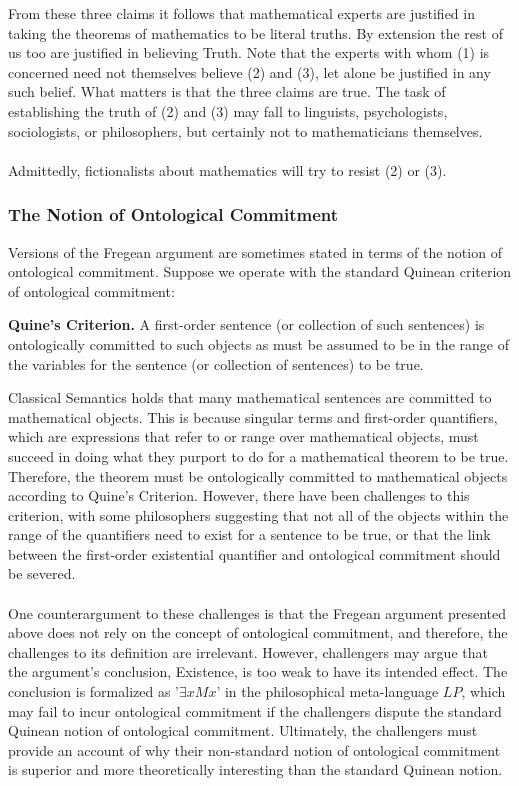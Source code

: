 \documentclass[10pt,a4paper]{article}
\newcounter{theo}
\begin{document}
                        From these three claims it follows that mathematical experts are justified in taking the theorems of mathematics to be literal truths. By extension the rest of us too are justified in believing Truth. Note that the experts with whom (1) is concerned need not themselves believe (2) and (3), let alone be justified in any such belief. What matters is that the three claims are true. The task of establishing the truth of (2) and (3) may fall to linguists, psychologists, sociologists, or philosophers, but certainly not to mathematicians themselves.
                        \\
                        \\
                        Admittedly, fictionalists about mathematics will try to resist (2) or (3).\cite{sep-platonism-mathematics}
                    \subsubsection{The Notion of Ontological Commitment}
                        Versions of the Fregean argument are sometimes stated in terms of the notion of ontological commitment. Suppose we operate with the standard Quinean criterion of ontological commitment:
                        \begin{qt}
                            \textbf{Quine’s Criterion.}
                            A first-order sentence (or collection of such sentences) is ontologically committed to such objects as must be assumed to be in the range of the variables for the sentence (or collection of sentences) to be true.
                        \end{qt}
                        Classical Semantics holds that many mathematical sentences are committed to mathematical objects. This is because singular terms and first-order quantifiers, which are expressions that refer to or range over mathematical objects, must succeed in doing what they purport to do for a mathematical theorem to be true. Therefore, the theorem must be ontologically committed to mathematical objects according to Quine's Criterion. However, there have been challenges to this criterion, with some philosophers suggesting that not all of the objects within the range of the quantifiers need to exist for a sentence to be true, or that the link between the first-order existential quantifier and ontological commitment should be severed. 
                        \\
                        \\
                        One counterargument to these challenges is that the Fregean argument presented above does not rely on the concept of ontological commitment, and therefore, the challenges to its definition are irrelevant. However, challengers may argue that the argument's conclusion, Existence, is too weak to have its intended effect. The conclusion is formalized as '$\exists xMx$' in the philosophical meta-language $LP$, which may fail to incur ontological commitment if the challengers dispute the standard Quinean notion of ontological commitment. Ultimately, the challengers must provide an account of why their non-standard notion of ontological commitment is superior and more theoretically interesting than the standard Quinean notion.
\end{document}
